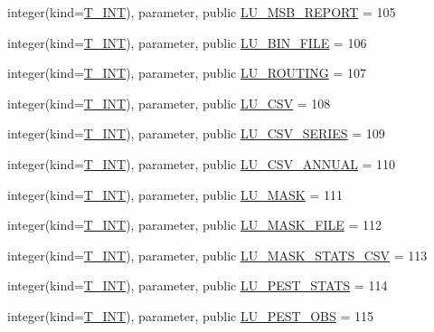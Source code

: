 \begin{DoxyCompactItemize}
\item 
integer(kind=\hyperlink{namespacetest_a6f91ebd89b58cfcc5da99faed9385c1e}{T\_\-INT}), parameter, public \hyperlink{namespacetest_a72b7d2a48ea511f8adea59b1392f541c}{LU\_\-MSB\_\-REPORT} = 105
\item 
integer(kind=\hyperlink{namespacetest_a6f91ebd89b58cfcc5da99faed9385c1e}{T\_\-INT}), parameter, public \hyperlink{namespacetest_ad2384d4c6037155a8ec2549d1d0bcfe4}{LU\_\-BIN\_\-FILE} = 106
\item 
integer(kind=\hyperlink{namespacetest_a6f91ebd89b58cfcc5da99faed9385c1e}{T\_\-INT}), parameter, public \hyperlink{namespacetest_a70f553900e15e79d97a1515e6550c1e7}{LU\_\-ROUTING} = 107
\item 
integer(kind=\hyperlink{namespacetest_a6f91ebd89b58cfcc5da99faed9385c1e}{T\_\-INT}), parameter, public \hyperlink{namespacetest_ad63b2c5042d42739d03ca38d8ec6f417}{LU\_\-CSV} = 108
\item 
integer(kind=\hyperlink{namespacetest_a6f91ebd89b58cfcc5da99faed9385c1e}{T\_\-INT}), parameter, public \hyperlink{namespacetest_aaf67717999e2b4cc413c0fe565f31c80}{LU\_\-CSV\_\-SERIES} = 109
\item 
integer(kind=\hyperlink{namespacetest_a6f91ebd89b58cfcc5da99faed9385c1e}{T\_\-INT}), parameter, public \hyperlink{namespacetest_a37ce335b13c6fe95c470ba7b67c88f92}{LU\_\-CSV\_\-ANNUAL} = 110
\item 
integer(kind=\hyperlink{namespacetest_a6f91ebd89b58cfcc5da99faed9385c1e}{T\_\-INT}), parameter, public \hyperlink{namespacetest_a6d15f5ccef6a1936e7fdfa3f785a97f7}{LU\_\-MASK} = 111
\item 
integer(kind=\hyperlink{namespacetest_a6f91ebd89b58cfcc5da99faed9385c1e}{T\_\-INT}), parameter, public \hyperlink{namespacetest_a4ef1befc57b809909da2a4f3bdb5853d}{LU\_\-MASK\_\-FILE} = 112
\item 
integer(kind=\hyperlink{namespacetest_a6f91ebd89b58cfcc5da99faed9385c1e}{T\_\-INT}), parameter, public \hyperlink{namespacetest_a494f7cd02f5647d3dd40276d2a080e09}{LU\_\-MASK\_\-STATS\_\-CSV} = 113
\item 
integer(kind=\hyperlink{namespacetest_a6f91ebd89b58cfcc5da99faed9385c1e}{T\_\-INT}), parameter, public \hyperlink{namespacetest_a9a71f73b35c56ff97dfc0c438945e783}{LU\_\-PEST\_\-STATS} = 114
\item 
integer(kind=\hyperlink{namespacetest_a6f91ebd89b58cfcc5da99faed9385c1e}{T\_\-INT}), parameter, public \hyperlink{namespacetest_a3b43ad5b8d9f36d9e1cfdf94bc02d83f}{LU\_\-PEST\_\-OBS} = 115
\item 

\end{DoxyCompactItemize}
